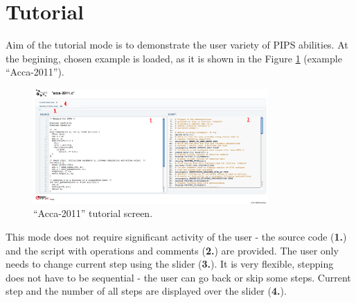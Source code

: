 \section{Tutorial}

Aim of the tutorial mode is to demonstrate the user variety of PIPS abilities. At the begining, chosen example is loaded, as it is shown in the Figure \ref{fig:tutorial_screen} (example ``Acca-2011''). 

\begin{figure}[h!]
  \centering
  \includegraphics[width=0.8\textwidth]{reportCh4/tutorial_screen}
  \caption{``Acca-2011'' tutorial screen.}
  \label{fig:tutorial_screen}
\end{figure}

This mode does not require significant activity of the user - the source code ({\bf 1.}) and the script with operations and comments ({\bf 2.}) are provided. The user only needs to change current step using the slider ({\bf 3.}). It is very flexible, stepping does not have to be sequential - the user can go back or skip some steps. Current step and the number of all steps are displayed over the slider ({\bf 4.}).